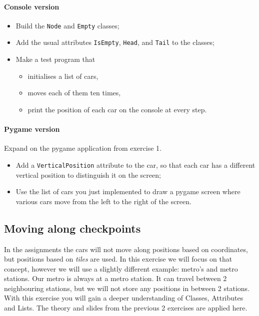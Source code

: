         \paragraph*{Console version}
        \begin{itemize}
            \item Build the \texttt{Node} and \texttt{Empty} classes;
            \item Add the usual attributes \texttt{IsEmpty}, \texttt{Head}, and \texttt{Tail} to the classes;
            \item Make a test program that
            \begin{itemize}
                \item initialises a list of cars,
                \item moves each of them ten times,
                \item print the position of each car on the console at every step.
            \end{itemize}
        \end{itemize}

        \paragraph*{Pygame version}
        Expand on the pygame application from exercise 1.

        \begin{itemize}
            \item Add a \texttt{VerticalPosition} attribute to the car, so that each car has a different vertical position to distinguish it on the screen;
            \item Use the list of cars you just implemented to draw a pygame screen where various cars move from the left to the right of the screen.
        \end{itemize}

    \subsection{Moving along checkpoints}
        In the assignments the cars will not move along positions based on coordinates, but positions based on \textit{tiles} are used.
        In this exercise we will focus on that concept, however we will use a slightly different example: metro's and metro stations.
        Our metro is always at a metro station. It can travel between 2 neighbouring stations, but we will not store any positions in between 2 stations.
        With this exercise you will gain a deeper understanding of Classes, Attributes and Lists.
        The theory and slides from the previous 2 exercises are applied here.

